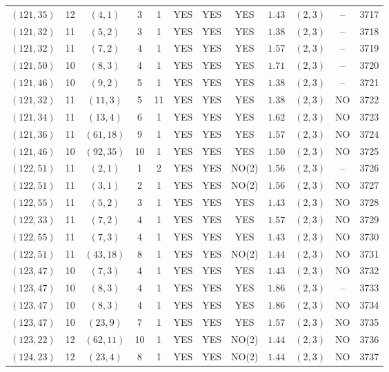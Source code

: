 \begin{longtable}{|c|c|c|c|c|c|c|c|c|c|c|c|}
$(121,35)$ & 12 & $(4,1)$ & 3 & 1 & YES & YES & YES & $1.43$ & $(2,3)$ & -- & 3717\\
$(121,32)$ & 11 & $(5,2)$ & 3 & 1 & YES & YES & YES & $1.38$ & $(2,3)$ & -- & 3718\\
$(121,32)$ & 11 & $(7,2)$ & 4 & 1 & YES & YES & YES & $1.57$ & $(2,3)$ & -- & 3719\\
$(121,50)$ & 10 & $(8,3)$ & 4 & 1 & YES & YES & YES & $1.71$ & $(2,3)$ & -- & 3720\\
$(121,46)$ & 10 & $(9,2)$ & 5 & 1 & YES & YES & YES & $1.38$ & $(2,3)$ & -- & 3721\\
$(121,32)$ & 11 & $(11,3)$ & 5 & 11 & YES & YES & YES & $1.38$ & $(2,3)$ & NO & 3722\\
$(121,34)$ & 11 & $(13,4)$ & 6 & 1 & YES & YES & YES & $1.62$ & $(2,3)$ & NO & 3723\\
$(121,36)$ & 11 & $(61,18)$ & 9 & 1 & YES & YES & YES & $1.57$ & $(2,3)$ & NO & 3724\\
$(121,46)$ & 10 & $(92,35)$ & 10 & 1 & YES & YES & YES & $1.50$ & $(2,3)$ & NO & 3725\\
$(122,51)$ & 11 & $(2,1)$ & 1 & 2 & YES & YES & NO(2) & $1.56$ & $(2,3)$ & -- & 3726\\
$(122,51)$ & 11 & $(3,1)$ & 2 & 1 & YES & YES & NO(2) & $1.56$ & $(2,3)$ & NO & 3727\\
$(122,55)$ & 11 & $(5,2)$ & 3 & 1 & YES & YES & YES & $1.43$ & $(2,3)$ & NO & 3728\\
$(122,33)$ & 11 & $(7,2)$ & 4 & 1 & YES & YES & YES & $1.57$ & $(2,3)$ & NO & 3729\\
$(122,55)$ & 11 & $(7,3)$ & 4 & 1 & YES & YES & YES & $1.43$ & $(2,3)$ & NO & 3730\\
$(122,51)$ & 11 & $(43,18)$ & 8 & 1 & YES & YES & NO(2) & $1.44$ & $(2,3)$ & NO & 3731\\
$(123,47)$ & 10 & $(7,3)$ & 4 & 1 & YES & YES & YES & $1.43$ & $(2,3)$ & NO & 3732\\
$(123,47)$ & 10 & $(8,3)$ & 4 & 1 & YES & YES & YES & $1.86$ & $(2,3)$ & -- & 3733\\
$(123,47)$ & 10 & $(8,3)$ & 4 & 1 & YES & YES & YES & $1.86$ & $(2,3)$ & NO & 3734\\
$(123,47)$ & 10 & $(23,9)$ & 7 & 1 & YES & YES & YES & $1.57$ & $(2,3)$ & NO & 3735\\
$(123,22)$ & 12 & $(62,11)$ & 10 & 1 & YES & YES & NO(2) & $1.44$ & $(2,3)$ & NO & 3736\\
$(124,23)$ & 12 & $(23,4)$ & 8 & 1 & YES & YES & NO(2) & $1.44$ & $(2,3)$ & NO & 3737\\

\end{longtable}
